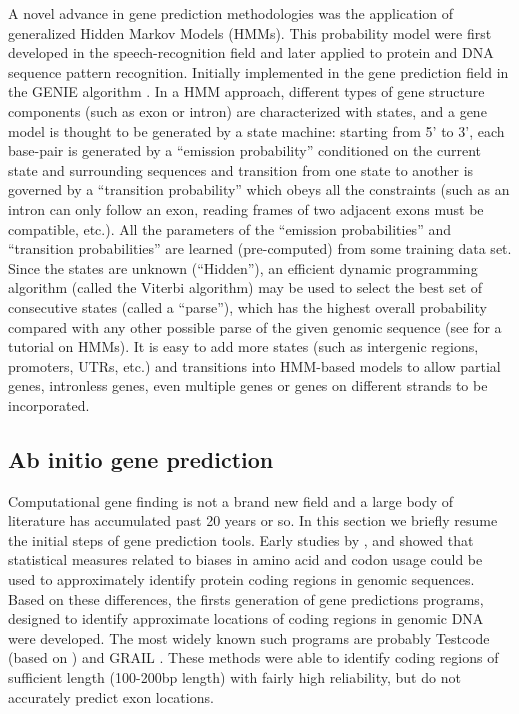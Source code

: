 A novel advance in gene prediction methodologies was the application
of generalized Hidden Markov Models (HMMs). This probability model
were first developed in the speech-recognition field and later applied
to protein and DNA sequence pattern recognition. Initially implemented
in the gene prediction field in the GENIE algorithm
\citep{kulp:1996a}.  In a HMM approach, different types of gene
structure components (such as exon or intron) are characterized with
states, and a gene model is thought to be generated by a state
machine: starting from 5' to 3', each base-pair is generated by a
``emission probability'' conditioned on the current state and
surrounding sequences and transition from one state to another is
governed by a ``transition probability'' which obeys all the
constraints (such as an intron can only follow an exon, reading frames
of two adjacent exons must be compatible, etc.). All the parameters of
the ``emission probabilities'' and ``transition probabilities'' are
learned (pre-computed) from some training data set. Since the states
are unknown (``Hidden''), an efficient dynamic programming algorithm
(called the Viterbi algorithm) may be used to select the best set of
consecutive states (called a ``parse''), which has the highest overall
probability compared with any other possible parse of the given
genomic sequence (see \cite{rabinier:1989a} for a tutorial on HMMs). It
is easy to add more states (such as intergenic regions, promoters,
UTRs, etc.) and transitions into HMM-based models to allow partial
genes, intronless genes, even multiple genes or genes on different
strands to be incorporated.

\subsection{Ab initio gene prediction}

Computational gene finding is not a brand new field and a large body
of literature has accumulated past 20 years or so. In this section we
briefly resume the initial steps of gene prediction tools. Early
studies by \cite{shepherd:1981a}, \cite{fickett:1982a} and
\cite{staden:1982a} showed that statistical measures related to
biases in amino acid and codon usage could be used to approximately
identify protein coding regions in genomic sequences.  Based on these
differences, the firsts generation of gene predictions programs,
designed to identify approximate locations of coding regions in
genomic DNA were developed. The most widely known such programs are
probably Testcode (based on \cite{fickett:1982a}) and GRAIL
\citep{uberbacher:1991a}.  These methods were able to identify coding
regions of sufficient length (100-200bp length) with fairly high
reliability, but do not accurately predict exon locations.

